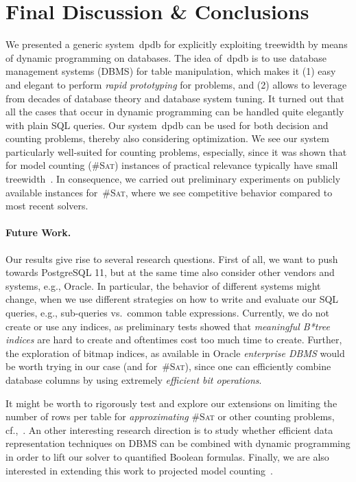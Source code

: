 \documentclass{llncs}
\newcommand{\cSAT}{\textsc{\#Sat}\xspace}%
\newcommand{\dpdb}{{\small\textsf{dpdb}}\xspace}
\begin{document}
\section{Final Discussion \& Conclusions}
%
%
%
%
%
%
%
%
%
We presented a generic system~\dpdb for explicitly exploiting treewidth
by means of dynamic programming on databases.
The idea of~\dpdb is to use database management systems (DBMS)
for table manipulation, which makes it (1) easy and elegant to
perform \emph{rapid prototyping} for problems,
and (2) allows to leverage from decades of database theory and 
database system tuning.
%
It turned out that all the cases that occur in dynamic programming can be handled
quite elegantly with plain SQL queries.
%
Our system~\dpdb can be used for both decision and counting problems,
thereby also considering optimization.
We see our system particularly well-suited for counting problems,
especially, since it was shown that for model counting (\cSAT)
instances of practical relevance typically have small treewidth~\cite{FichteHecherZisser19}.
%
%
In consequence, we carried out preliminary experiments on publicly available instances for~\cSAT, 
where we see competitive behavior compared to most recent solvers.
%
%

\paragraph{Future Work.}
Our results give rise to several research questions.
%
First of all, we want to push towards PostgreSQL 11, but at the same time
also consider other vendors and systems, e.g., Oracle.
In particular, the behavior of different systems might change,
when we use different strategies on how to write and evaluate our SQL queries, 
e.g., sub-queries vs.\ common table expressions.
%
Currently, we do not create or use any indices,
as preliminary tests showed that \emph{meaningful B*tree indices} are hard to create
and oftentimes cost too much time to create. %
%
Further, the exploration of bitmap indices, as available in Oracle \emph{enterprise DBMS} would be worth trying in our case (and for~\cSAT), 
since one can efficiently combine database columns by 
using extremely \emph{efficient bit operations}.
%

It might be worth to rigorously test and explore our extensions on limiting the number of rows per table for \emph{approximating} \cSAT or other counting problems, cf.,~\cite{ChakrabortyMeelVardi16a,MeelEtAl17a}.
%
%
An other interesting research direction is to study whether
efficient data representation techniques on DBMS can be combined with dynamic
programming in order to lift our solver to quantified Boolean formulas.
%
%
Finally, we are also interested in extending this work to projected
model counting~\cite{FichteEtAl18d}.
%
%
%

%


%
\end{document}
